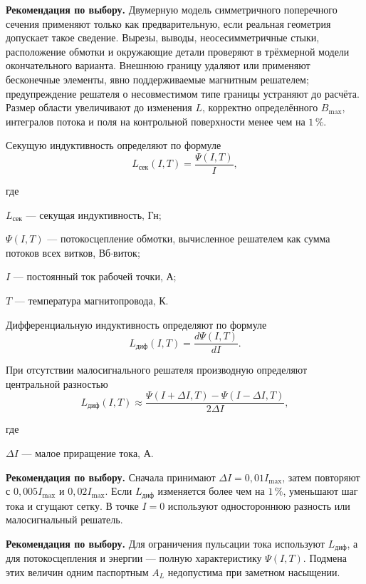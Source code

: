 \documentclass[14pt,a4paper]{extarticle}
\newcommand{\recommend}{\par\noindent\textbf{Рекомендация по выбору.} }
\newenvironment{whereblock}
 {\par\noindent где\par
  \begin{list}{}{\setlength{\leftmargin}{12.5mm}
                  \setlength{\itemindent}{-12.5mm}
                  \setlength{\itemsep}{0pt}
                  \setlength{\parsep}{0pt}
                  \setlength{\topsep}{0pt}}}
 {\end{list}}
\newcommand{\whereitem}[2]{\item[] #1 --- #2}
\begin{document}
\recommend Двумерную модель симметричного поперечного сечения применяют
только как предварительную, если реальная геометрия допускает такое
сведение. Вырезы, выводы, неосесимметричные стыки, расположение обмотки и
окружающие детали проверяют в трёхмерной модели окончательного варианта.
Внешнюю границу удаляют или применяют бесконечные элементы, явно
поддерживаемые магнитным решателем; предупреждение решателя о несовместимом
типе границы устраняют до расчёта. Размер области увеличивают до изменения
$L$, корректно определённого $B_{\max}$, интегралов потока и поля на
контрольной поверхности менее чем на $1\,\%$.

Секущую индуктивность определяют по формуле
\begin{equation}
 L_{\text{сек}}(I,T)=\frac{\Psi(I,T)}{I},
 \label{eq:secant-inductance}
\end{equation}
\begin{whereblock}
\whereitem{$L_{\text{сек}}$}{секущая индуктивность, Гн;}
\whereitem{$\Psi(I,T)$}{потокосцепление обмотки, вычисленное решателем как
сумма потоков всех витков, Вб$\cdot$виток;}
\whereitem{$I$}{постоянный ток рабочей точки, А;}
\whereitem{$T$}{температура магнитопровода, К.}
\end{whereblock}

Дифференциальную индуктивность определяют по формуле
\begin{equation}
 L_{\text{диф}}(I,T)=\frac{d\Psi(I,T)}{dI}.
 \label{eq:differential-inductance}
\end{equation}

При отсутствии малосигнального решателя производную определяют центральной
разностью
\begin{equation}
 L_{\text{диф}}(I,T)\approx
 \frac{\Psi(I+\Delta I,T)-\Psi(I-\Delta I,T)}
 {2\Delta I},
 \label{eq:differential-inductance-fd}
\end{equation}
\begin{whereblock}
\whereitem{$\Delta I$}{малое приращение тока, А.}
\end{whereblock}

\recommend Сначала принимают $\Delta I=0{,}01I_{\max}$, затем повторяют с
$0{,}005I_{\max}$ и $0{,}02I_{\max}$. Если $L_{\text{диф}}$ изменяется более
чем на $1\,\%$, уменьшают шаг тока и сгущают сетку. В точке $I=0$ используют
одностороннюю разность или малосигнальный решатель.

\recommend Для ограничения пульсации тока используют
$L_{\text{диф}}$, а для потокосцепления и энергии --- полную
характеристику $\Psi(I,T)$. Подмена этих величин одним паспортным
$A_L$ недопустима при заметном насыщении.
\end{document}
